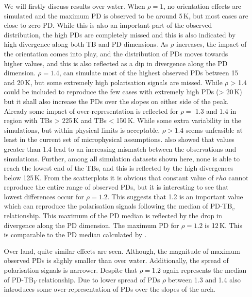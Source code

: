 \documentclass[amt, manuscript]{copernicus}
\begin{document}
We will firstly discuss results over water. When $\rho = 1$, no orientation effects are simulated and the maximum PD is observed to be around 5\,K, but most cases are close to zero PD. While this is also an important part of the observed distribution, the high PDs are completely missed and this is also indicated by high divergence along both TB and PD dimensions. As $\rho$ increases, the impact of the orientation comes into play, and the distribution of PDs moves towards higher values, and this is also reflected as a dip in divergence along the PD dimension.  $\rho = 1.4$, can simulate most of the highest observed PDs between 15 and 20\,K, but some extremely high polarisation signals are missed. While $\rho$ > 1.4  could be included to reproduce the few cases with extremely high PDs (> 20\,K) but it shall also increase the PDs over the slopes on either side of the peak. Already some impact of over-representation is reflected for $\rho =$ 1.3 and 1.4 in region with TBs > 225\,K and TBs < 150\,K. While some extra variability in the simulations, but within physical limits is acceptable, $\rho > 1.4$ seems unfeasible at least in the current set of microphysical assumptions. \citet{barlakas:intro:21} also showed that values greater than 1.4 lead to an increasing mismatch between the observations and simulations. Further, among all simulation datasets shown here, none is able to reach the lowest end of the TBs, and this is reflected by the high divergences below 125\,K. From the scatterplots it is obvious that constant value of $rho$ cannot reproduce the entire range of observed PDs, but it is  interesting to see that lowest differences occur for  $\rho = 1.2$. This suggests that 1.2 is an important value which can reproduce the polarisation signals following the median of PD-TB$_{v}$ relationship. This maximum of the PD median is reflected by the drop in divergence along the PD dimension. The maximum PD for $\rho = 1.2$ is 12\,K. This is comparable to the PD median calculated by \citet{galligani:param:21}. 

Over land, quite similar effects are seen. Although, the magnitude of maximum observed PDs is slighly smaller than over water. Additionally, the spread of polarisation signals is narrower. Despite that $\rho = 1.2$ again represents the median of PD-TB$_{V}$ relationship. Due to lower spread of PDs $\rho$ between 1.3 and 1.4 also introduces some over-representation of PDs over the slopes of the arch. 
\end{document}
